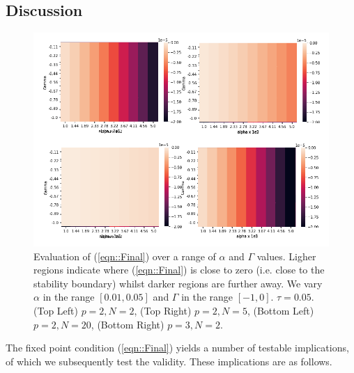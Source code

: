 \documentclass[sigconf,anonymous]{aamas}
\begin{document}
\subsection{Discussion}

\begin{figure}[t]
    \includegraphics[width = 1.2 \linewidth, center]{Figures/Theory.png}
    \caption{Evaluation of (\ref{eqn::Final}) over a range of $\alpha$ and $\Gamma$ values. Ligher regions indicate where (\ref{eqn::Final}) is close to zero (i.e. close to the stability boundary) whilst darker regions are further away. We vary $\alpha$ in the range $[0.01, 0.05]$ and $\Gamma$ in the range $[-1, 0]$. $\tau = 0.05$. (Top Left) $p = 2, N = 2$, (Top Right) $p = 2, N = 5$, (Bottom Left) $p = 2, N = 20$, (Bottom Right) $p=3, N = 2$.}
    \label{fig:theory}
\end{figure}

The fixed point condition (\ref{eqn::Final}) yields a number of testable implications, of which we subsequently test the validity. These implications are as follows.
\end{document}
